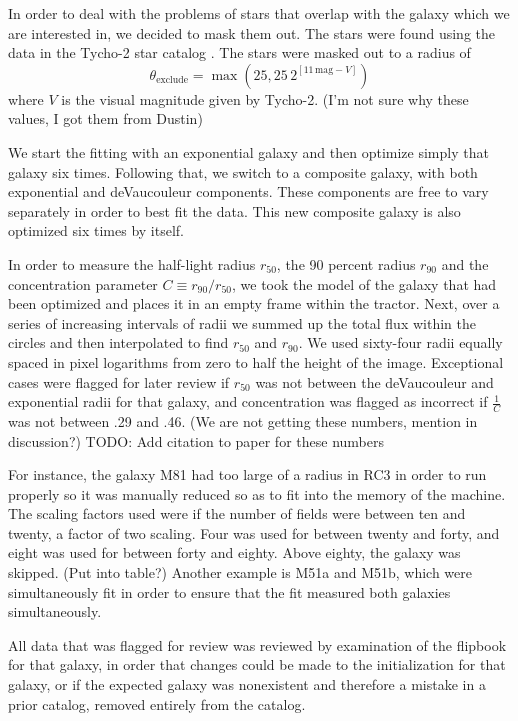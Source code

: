 \documentclass[12pt,preprint,pdftex]{aastex}
\newcommand{\units}[1]{\mathrm{#1}}
\renewcommand{\mag}{\units{mag}}
\newcommand{\rfifty}{r_{50}}
\newcommand{\rninety}{r_{90}}
\newcommand{\conc}{C}
\begin{document}
In order to deal with the problems of stars that overlap with the
galaxy which we are interested in, we decided to mask them out. The
stars were found using the data in the Tycho-2 star catalog \citep{tycho2}.
The stars were masked out to a
radius of
\begin{equation}
\theta_{\mathrm{exclude}} = \max(25, 25\,2^{[11\,\mag-V]})
\end{equation}
where $V$ is the visual magnitude given by Tycho-2.
(I'm not sure why these values, I got them from Dustin)



We start the fitting with an exponential galaxy and then optimize
simply that galaxy six times. Following that, we switch to a composite
galaxy, with both exponential and deVaucouleur components. These
components are free to vary separately in order to best fit the
data. This new composite galaxy is also optimized six times by itself.

In order to measure the half-light radius $\rfifty$, the 90 percent
radius $\rninety$ and the concentration parameter $\conc\equiv
\rninety/\rfifty$, we took the model of the galaxy that had been
optimized and places it in an empty frame within the tractor. Next,
over a series of increasing intervals of radii we summed up the total
flux within the circles and then interpolated to find $\rfifty$ and $\rninety$. We used sixty-four radii equally spaced in pixel logarithms from zero to half the height of the image.
Exceptional cases were flagged for later review if $\rfifty$ was not between the deVaucouleur and exponential radii for that galaxy, and concentration was flagged as incorrect if $\frac{1}{\conc}$ was not between .29 and .46. (We are not getting these numbers, mention in discussion?) TODO: Add citation to paper for these numbers

For instance, the galaxy M81 had too large of a radius in RC3 in order to run properly so it was manually reduced so as to fit into the memory of the machine. The scaling factors used were if the number of fields were between ten and twenty, a factor of two scaling. Four was used for between twenty and forty, and eight was used for between forty and eighty. Above eighty, the galaxy was skipped. (Put into table?) Another example is M51a and M51b, which were simultaneously fit in order to ensure that the fit measured both galaxies simultaneously. 

All data that was flagged for review was reviewed by examination of the flipbook for that galaxy, in order that changes could be made to the initialization for that galaxy, or if the expected galaxy was nonexistent and therefore a mistake in a prior catalog, removed entirely from the catalog. 
\end{document}
